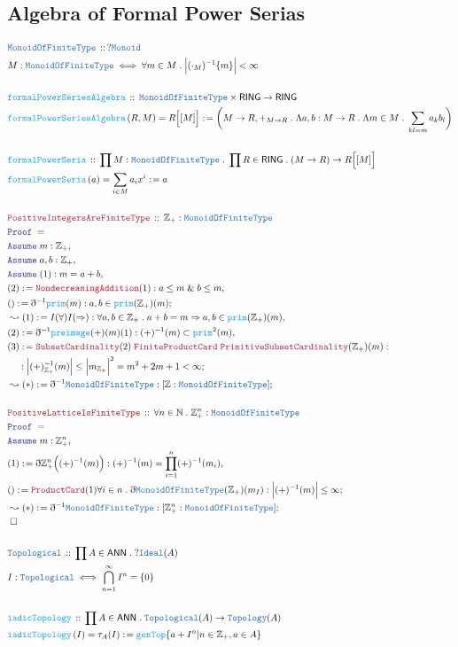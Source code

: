 \documentclass[12pt]{scrartcl}
\newcommand{\TYPE}[1]{\textcolor{NavyBlue}{\mathtt{#1}}}
\newcommand{\FUNC}[1]{\textcolor{Cerulean}{\mathtt{#1}}}
\newcommand{\LOGIC}[1]{\textcolor{Blue}{\mathtt{#1}}}
\newcommand{\THM}[1]{\textcolor{Maroon}{\mathtt{#1}}}
\renewcommand{\.}{\; . \;}
\newcommand{\de}{: \kern 0.1pc =}
\newcommand{\Act}[1]{\left( #1 \right)}
\newcommand{\Theorem}[2]{& \THM{#1} \, :: \, #2 \\ & \Proof = \\ }
\newcommand{\DeclareType}[2]{& \TYPE{#1} \, :: \, #2 \\}
\newcommand{\DefineType}[3]{& #1 : \TYPE{#2} \iff #3 \\}
\newcommand{\DeclareFunc}[2]{& \FUNC{#1} \, :: \, #2 \\}
\newcommand{\DefineNamedFunc}[4]{&  \FUNC{#1}\Act{#2} = #3 \de #4 \\}
\newcommand{\NewLine}{\\ & \kern 1pc}
\newcommand{\Page}[1]{ \begin{align*} #1 \end{align*}   }
\newcommand{ \bd }{ \ByDef }
\renewcommand{\And}{\; \& \;}
\newcommand{\Int}{\mathbb{Z} }
\newcommand{\Nat}{\mathbb{N} }
\newcommand{\Say}[3]{& #1 \de #2 : #3, \\}
\newcommand{\Conclude}[3]{& #1 \de #2 : #3; \\}
\newcommand{\Derive}[3]{& \leadsto #1 \de #2 : #3, \\}
\newcommand{\DeriveConclude}[3]{& \leadsto #1 \de #2 : #3 ; \\}
\newcommand{\Assume}[2]{& \LOGIC{Assume} \; #1 : #2, \\}
\newcommand{\QED}{\; \square}
\newcommand{\EndProof}{& \QED \\}
\newcommand{\ByDef}{\eth}
\newcommand{\Proof}{\LOGIC{Proof} \; }
\newcommand{\Ideal}{\TYPE{Ideal}}
\newcommand{\MoFT}{\TYPE{MonoidOfFiniteType}}
\newcommand{\RING}{\mathsf{RING}}
\newcommand{\ANN}{\mathsf{ANN}}
\begin{document}
\subsection{Algebra of Formal Power Serias}
\Page{
	\DeclareType{\MoFT}{?\TYPE{Monoid}}
	\DefineType{M}{\MoFT}{\forall m \in M \.  \Big| (\cdot_M)^{-1}\{m\} \Big| < \infty}
	\\
	\DeclareFunc{formalPowerSeriesAlgebra}{ \MoFT \times \RING \to \RING}
	\DefineNamedFunc{formalPowerSeriesAlgebra}{R,M}{R\Big[[M]\Big]}{\bigg( M \to R, +_{M \to R} \. \Lambda a,b : M \to R \. \Lambda m \in M \. \sum_{kl = m} a_kb_l \bigg)}
	\\
	\DeclareFunc{formalPowerSeria}{ \prod M : \MoFT \. \prod R \in \RING \. (M \to R) \to  R\Big[[M]\Big]  }
	\DefineNamedFunc{formalPowerSeria}{a}{\sum_{i \in M} a_i x^i }{a}
	\\
	\Theorem{PositiveIntegersAreFiniteType}{ \Int_+ : \MoFT}
	\Assume{m}{\Int_+}
	\Assume{a,b}{\Int_+}
	\Assume{(1)}{m = a + b}
	\Say{(2)}{\THM{NondecreasingAddition}(1)}{ a \le m \And b \le m }
	\Conclude{()}{\bd^{-1} \FUNC{prim}(m)  }{ a,b \in \FUNC{prim}(\Int_+)(m)  }
	\Derive{(1)}{I(\forall)I(\Rightarrow)}{ \forall a,b \in \Int_+ \. a + b = m \Rightarrow a,b \in  \FUNC{prim}(\Int_+)(m)  }
	\Say{(2)}{\bd^{-1}\FUNC{preimage}(+)(m)(1)}{ (+)^{-1}(m) \subset \FUNC{prim}^2(m)}
	\Conclude{(3)}{\THM{SubsetCardinality}(2)\; \THM{FiniteProductCard}\; \THM{PrimitiveSubsetCardinality}(\Int_+)(m)}{ 
		\NewLine : \Big| (+)_{\Int_+}^{-1}(m)\Big| \le \Big|m_{\Int_+}\Big|^2 = m^2 + 2m + 1 < \infty}
	\DeriveConclude{(*)}{\bd^{-1}\MoFT}{[\Int : \MoFT]} 
	\\
	\Theorem{PositiveLatticeIsFiniteType}{ \forall n \in \Nat \. \Int_+^n : \MoFT  }
	\Assume{m}{\Int^n_+}
	\Say{(1)}{ \bd \Int^n_+\Big( (+)^{-1}(m) \Big)  }{ (+)^{-1}(m) = \prod^n_{i=1} (+)^{-1}(m_i)}
	\Conclude{()}{\THM{ProductCard}(1)\forall i \in n \. \bd \MoFT(\Int_+)(m_I)}{\Big| (+)^{-1}(m) \Big| \le \infty  }
	\DeriveConclude{(*)}{\bd^{-1}\MoFT}{[\Int^n_+ : \MoFT]}
	\EndProof
	\\
	\DeclareType{Topological}{\prod A \in \ANN \. ?\Ideal(A)}
	\DefineType{I}{Topological}{\bigcap^{\infty}_{n=1}I^n = \{0\}}
	\\
	\DeclareFunc{iadicTopology}{\prod A \in \ANN \. \TYPE{Topological}(A) \to \TYPE{Topology}(A)}
	\DefineNamedFunc{iadicTopology}{I}{\tau_A(I)}{\FUNC{genTop}\{ a + I^n | n \in \Int_+,a \in A\}}
}
\end{document}
